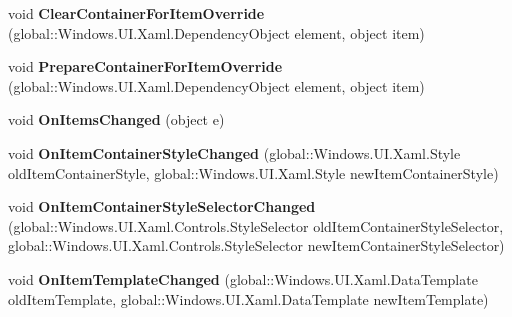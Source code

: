 \begin{DoxyCompactItemize}
\item 
\mbox{\label{interface_windows_1_1_u_i_1_1_xaml_1_1_controls_1_1_i_items_control_overrides_aa7629a88ebc4029aab0c438c06ec0b82}} 
void {\bfseries Clear\+Container\+For\+Item\+Override} (global\+::\+Windows.\+U\+I.\+Xaml.\+Dependency\+Object element, object item)
\item 
\mbox{\label{interface_windows_1_1_u_i_1_1_xaml_1_1_controls_1_1_i_items_control_overrides_a4ebcd3ec353d6e23fb9fc344cc643e0e}} 
void {\bfseries Prepare\+Container\+For\+Item\+Override} (global\+::\+Windows.\+U\+I.\+Xaml.\+Dependency\+Object element, object item)
\item 
\mbox{\label{interface_windows_1_1_u_i_1_1_xaml_1_1_controls_1_1_i_items_control_overrides_aeca7ab8e157178a6cc021cee26bf5388}} 
void {\bfseries On\+Items\+Changed} (object e)
\item 
\mbox{\label{interface_windows_1_1_u_i_1_1_xaml_1_1_controls_1_1_i_items_control_overrides_aec19844110896dfbbe9fb5a9ddea5cea}} 
void {\bfseries On\+Item\+Container\+Style\+Changed} (global\+::\+Windows.\+U\+I.\+Xaml.\+Style old\+Item\+Container\+Style, global\+::\+Windows.\+U\+I.\+Xaml.\+Style new\+Item\+Container\+Style)
\item 
\mbox{\label{interface_windows_1_1_u_i_1_1_xaml_1_1_controls_1_1_i_items_control_overrides_a4d197dd9f2dbb42d5ba7828014c6d966}} 
void {\bfseries On\+Item\+Container\+Style\+Selector\+Changed} (global\+::\+Windows.\+U\+I.\+Xaml.\+Controls.\+Style\+Selector old\+Item\+Container\+Style\+Selector, global\+::\+Windows.\+U\+I.\+Xaml.\+Controls.\+Style\+Selector new\+Item\+Container\+Style\+Selector)
\item 
\mbox{\label{interface_windows_1_1_u_i_1_1_xaml_1_1_controls_1_1_i_items_control_overrides_ac592214833c559a28551ba9ccb0b4d2a}} 
void {\bfseries On\+Item\+Template\+Changed} (global\+::\+Windows.\+U\+I.\+Xaml.\+Data\+Template old\+Item\+Template, global\+::\+Windows.\+U\+I.\+Xaml.\+Data\+Template new\+Item\+Template)

\end{DoxyCompactItemize}

